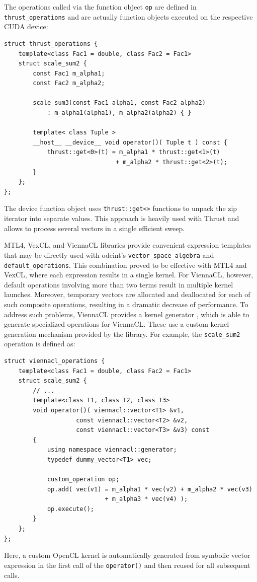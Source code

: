 \documentclass[final]{siamltex}
\newcommand{\code}[1]{\lstinline$#1$}
\begin{document}
The operations called via the function object \code{op} are defined in
\code{thrust_operations} and are actually function objects executed on the
respective CUDA device:
\begin{lstlisting}
struct thrust_operations {
    template<class Fac1 = double, class Fac2 = Fac1>
    struct scale_sum2 {
        const Fac1 m_alpha1;
        const Fac2 m_alpha2;

        scale_sum3(const Fac1 alpha1, const Fac2 alpha2)
            : m_alpha1(alpha1), m_alpha2(alpha2) { }

        template< class Tuple >
        __host__ __device__ void operator()( Tuple t ) const {
            thrust::get<0>(t) = m_alpha1 * thrust::get<1>(t)
                               + m_alpha2 * thrust::get<2>(t);
        }
    };
};
\end{lstlisting}
The device function object uses \code{thrust::get<>} functions to unpack the
zip iterator into separate values.  This approach is heavily used with Thrust
and allows to process several vectors in a single efficient sweep.


\begin{sloppypar}
  MTL4, VexCL, and ViennaCL libraries provide convenient
  expression templates that may be directly used with odeint's
  \code{vector_space_algebra} and \code{default_operations}. This
  combination proved to be effective with MTL4 and VexCL, where each
  expression results in a single kernel. For ViennaCL, however,
  default operations involving more than two terms result in multiple
  kernel launches.  Moreover, temporary vectors are allocated and
  deallocated for each of such composite operations, resulting in a
  dramatic decrease of performance.  To address such problems,
  ViennaCL provides a kernel generator \cite{tillet:kernel-generator},
  which is able to generate specialized operations for ViennaCL. These
  use a custom kernel generation mechanism provided by the library.
  For example, the \code{scale_sum2} operation is defined as:
\begin{lstlisting}
struct viennacl_operations {
    template<class Fac1 = double, class Fac2 = Fac1>
    struct scale_sum2 {
        // ...
        template<class T1, class T2, class T3>
        void operator()( viennacl::vector<T1> &v1,
                    const viennacl::vector<T2> &v2,
                    const viennacl::vector<T3> &v3) const
        {
            using namespace viennacl::generator;
            typedef dummy_vector<T1> vec;

            custom_operation op;
            op.add( vec(v1) = m_alpha1 * vec(v2) + m_alpha2 * vec(v3)
                            + m_alpha3 * vec(v4) );
            op.execute();
        }
    };
};
\end{lstlisting}
Here, a custom OpenCL kernel is automatically generated from symbolic vector
expression in the first call of the \code{operator()} and then reused for all
subsequent calls.
\end{sloppypar}
\end{document}
